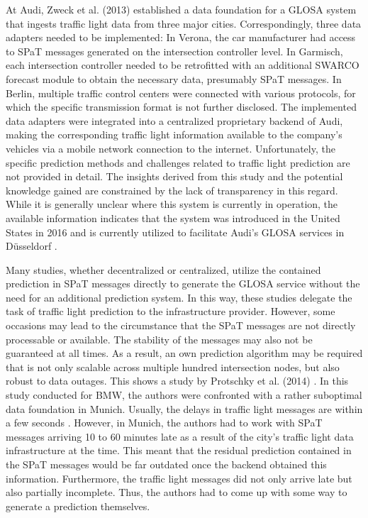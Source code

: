 At Audi, Zweck et al. (2013) \cite{zweck_traffic_2013} established a data foundation for a GLOSA system that ingests traffic light data from three major cities. Correspondingly, three data adapters needed to be implemented: In Verona, the car manufacturer had access to SPaT messages generated on the intersection controller level. In Garmisch, each intersection controller needed to be retrofitted with an additional SWARCO forecast module to obtain the necessary data, presumably SPaT messages. In Berlin, multiple traffic control centers were connected with various protocols, for which the specific transmission format is not further disclosed. The implemented data adapters were integrated into a centralized proprietary backend of Audi, making the corresponding traffic light information available to the company's vehicles via a mobile network connection to the internet. Unfortunately, the specific prediction methods and challenges related to traffic light prediction are not provided in detail. The insights derived from this study and the potential knowledge gained are constrained by the lack of transparency in this regard. While it is generally unclear where this system is currently in operation, the available information indicates that the system was introduced in the United States in 2016 and is currently utilized to facilitate Audi's GLOSA services in Düsseldorf \cite{neuner_leitfaden_2020}.

Many studies, whether decentralized or centralized, utilize the contained prediction in SPaT messages directly to generate the GLOSA service without the need for an additional prediction system. In this way, these studies delegate the task of traffic light prediction to the infrastructure provider. However, some occasions may lead to the circumstance that the SPaT messages are not directly processable or available. The stability of the messages may also not be guaranteed at all times. As a result, an own prediction algorithm may be required that is not only scalable across multiple hundred intersection nodes, but also robust to data outages. This shows a study by Protschky et al. (2014) \cite{protschky_extensive_2014, protschky_adaptive_2014}. In this study conducted for BMW, the authors were confronted with a rather suboptimal data foundation in Munich. Usually, the delays in traffic light messages are within a few seconds \cite{neuner_leitfaden_2020}. However, in Munich, the authors had to work with SPaT messages arriving 10 to 60 minutes late as a result of the city's traffic light data infrastructure at the time. This meant that the residual prediction contained in the SPaT messages would be far outdated once the backend obtained this information. Furthermore, the traffic light messages did not only arrive late but also partially incomplete. Thus, the authors had to come up with some way to generate a prediction themselves. 

